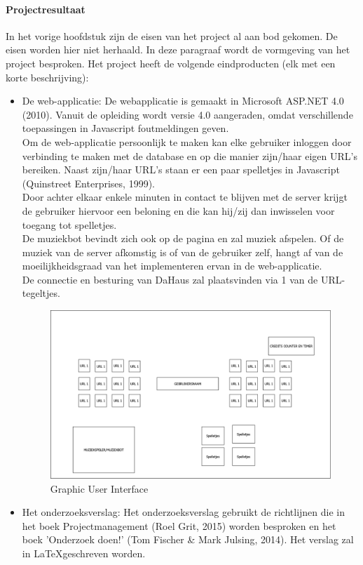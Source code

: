 \documentclass[11pt]{article}
\begin{document}
\paragraph{Projectresultaat}
\begin{flushleft}
	In het vorige hoofdstuk zijn de eisen van het project al aan bod gekomen. De eisen worden hier niet herhaald. In deze paragraaf wordt de vormgeving van het project besproken. 
	Het project heeft de volgende eindproducten (elk met een korte beschrijving):
	\begin{itemize}
		\item De web-applicatie: De webapplicatie is gemaakt in Microsoft ASP.NET 4.0 (2010). Vanuit de opleiding wordt versie 4.0 aangeraden, omdat verschillende toepassingen in Javascript foutmeldingen geven. \\ 
		Om de web-applicatie persoonlijk te maken kan elke gebruiker inloggen door verbinding te maken met de database en op die manier zijn/haar eigen URL's bereiken. Naast zijn/haar URL's staan er een paar spelletjes in Javascript (Quinstreet Enterprises, 1999).\\ Door achter elkaar enkele minuten in contact te blijven met de server krijgt de gebruiker hiervoor een beloning en die kan hij/zij dan inwisselen voor toegang tot spelletjes. \\De muziekbot bevindt zich ook op de pagina en zal muziek afspelen. Of de muziek van de server afkomstig is of van de gebruiker zelf, hangt af van de moeilijkheidsgraad van het implementeren ervan in de web-applicatie. \\
		De connectie en besturing van DaHaus zal plaatsvinden via 1 van de URL-tegeltjes. \\ \vspace{2mm}
		\begin{figure}
		\centering
		\includegraphics[width=\textwidth]{GUI} 
		\caption{Graphic User Interface}
		\end{figure}  \vspace{2mm}
		
		\item Het onderzoeksverslag: Het onderzoeksverslag gebruikt de richtlijnen die in het boek Projectmanagement (Roel Grit, 2015) worden besproken en het boek 'Onderzoek doen!' (Tom Fischer \& Mark Julsing, 2014). 
		Het verslag zal in \LaTeX geschreven worden. 
	\end{itemize}



\end{flushleft}
\newpage
\end{document}
